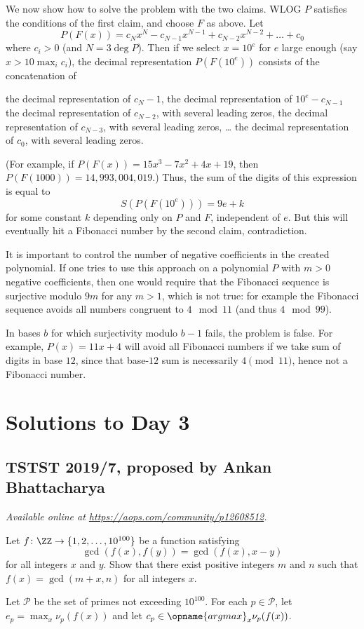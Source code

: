 \documentclass[11pt]{scrartcl}
\begin{document}
We now show how to solve the problem with the two claims.
WLOG $P$ satisfies the conditions of the first claim,
and choose $F$ as above.
Let
\[ P(F(x)) = c_N x^N - c_{N-1} x^{N-1} + c_{N-2} x^{N-2} + \dots + c_0 \]
where $c_i > 0$ (and $N = 3 \deg P$).
Then if we select $x = 10^e$ for $e$ large enough
(say $x > 10\max_i c_i$),
the decimal representation $P(F(10^e))$ consists of the concatenation of
\begin{itemize}
  \ii the decimal representation of $c_N-1$,
  \ii the decimal representation of $10^e-c_{N-1}$
  \ii the decimal representation of $c_{N-2}$,
  with several leading zeros,
  \ii the decimal representation of $c_{N-3}$,
  with several leading zeros,
  \ii \dots
  \ii the decimal representation of $c_0$, with several leading zeros.
\end{itemize}
(For example,
if $P(F(x)) = 15x^3 - 7x^2 + 4x + 19$,
then $P(F(1000)) = 14{,}993{,}004{,}019$.)
Thus, the sum of the digits of this expression
is equal to
\[ S(P(F(10^e))) = 9e + k \]
for some constant $k$ depending only on $P$ and $F$,
independent of $e$.
But this will eventually hit a Fibonacci number by the second claim,
contradiction.

\begin{remark*}
  It is important to control the number of negative coefficients
  in the created polynomial.
  If one tries to use this approach on a polynomial $P$
  with $m > 0$ negative coefficients,
  then one would require that the Fibonacci sequence
  is surjective modulo $9m$ for any $m > 1$,
  which is not true:
  for example the Fibonacci sequence avoids all numbers
  congruent to $4 \mod{11}$ (and thus $4 \mod{99}$).

  In bases $b$ for which surjectivity modulo $b-1$ fails,
  the problem is false.
  For example, $P(x) = 11x+4$ will avoid all Fibonacci
  numbers if we take sum of digits in base $12$,
  since that base-$12$ sum is necessarily $4 \pmod{11}$,
  hence not a Fibonacci number.
\end{remark*}
\pagebreak

\section{Solutions to Day 3}
\subsection{TSTST 2019/7, proposed by Ankan Bhattacharya}
\textsl{Available online at \url{https://aops.com/community/p12608512}.}
\begin{mdframed}[style=mdpurplebox,frametitle={Problem statement}]
Let $f \colon \ZZ \to \{1, 2, \dots, 10^{100}\}$
be a function satisfying
\[ \gcd(f(x), f(y)) = \gcd(f(x), x-y) \]
for all integers $x$ and $y$.
Show that there exist positive integers $m$ and $n$ such that
$f(x) = \gcd(m + x, n)$ for all integers $x$.
\end{mdframed}
Let $\mathcal{P}$ be the set of primes not exceeding $10^{100}$.
For each $p \in \mathcal{P}$, let $e_p = \max_x \nu_p(f(x))$
and let $c_p \in \opname{argmax}_x \nu_p(f(x))$.
\end{document}
